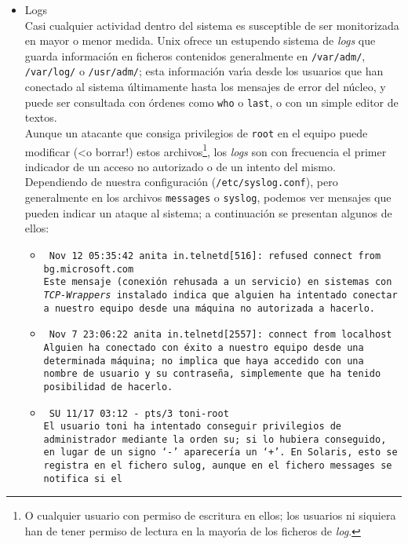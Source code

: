 \begin{itemize}
\item Logs\\
Casi cualquier actividad dentro del sistema es susceptible de ser monitorizada
en mayor o menor medida. Unix ofrece un estupendo sistema de {\it logs} que
guarda informaci\'on en ficheros contenidos generalmente en {\tt /var/adm/}, 
{\tt /var/log/} o {\tt /usr/adm/}; esta informaci\'on var\'{\i}a desde los 
usuarios que han conectado al sistema \'ultimamente hasta los mensajes de error
del n\'ucleo, y puede ser consultada con \'ordenes como {\tt who} o {\tt last},
o con un simple editor de textos.\\
Aunque un atacante que consiga privilegios de {\tt root} en el equipo puede
modificar (<o borrar!) estos archivos\footnote{O cualquier usuario con permiso 
de escritura en ellos; los usuarios ni siquiera han de tener permiso de lectura 
en la 
mayor\'{\i}a de los ficheros de {\it log}.}, los {\it logs} son con frecuencia 
el primer indicador de un acceso no autorizado o de un intento del mismo. 
Dependiendo de nuestra configuraci\'on ({\tt /etc/syslog.conf}), pero 
generalmente en los archivos {\tt messages} o {\tt syslog}, podemos ver mensajes
que pueden indicar un ataque al sistema; a continuaci\'on se presentan algunos
de ellos:
\begin{itemize}
\item \tt
\small{Nov 12 05:35:42 anita in.telnetd[516]: refused connect from bg.microsoft.com}\\
\rm
\normalsize
Este mensaje (conexi\'on rehusada a un servicio) en sistemas con {\it 
TCP-Wrappers} instalado indica que alguien ha intentado conectar a nuestro 
equipo desde una m\'aquina no autorizada a hacerlo.
\item \tt
\small{Nov  7 23:06:22 anita in.telnetd[2557]: connect from localhost}\\
\rm
\normalsize
Alguien ha conectado con \'exito a nuestro equipo desde una determinada 
m\'aquina; no implica que haya accedido con una nombre de usuario y su 
contrase\~na, simplemente que ha tenido posibilidad de hacerlo.
\item \tt
\small{SU 11/17 03:12 - pts/3 toni-root}\\
\rm
\normalsize
El usuario {\tt toni} ha intentado conseguir privilegios de administrador 
mediante la orden {\tt su}; si lo hubiera conseguido, en lugar de un signo 
{\tt `-'} aparecer\'{\i}a un {\tt `+'}. En Solaris, esto se registra en el
fichero {\tt sulog}, aunque en el fichero {\tt messages} se notifica si el 

\end{itemize}
\end{itemize}
